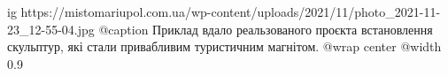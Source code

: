  
 
 
 
 

\ifcmt
  ig https://mistomariupol.com.ua/wp-content/uploads/2021/11/photo_2021-11-23_12-55-04.jpg
	@caption Приклад вдало реальзованого проєкта встановлення скульптур, які стали привабливим туристичним магнітом.
  @wrap center
  @width 0.9
\fi
